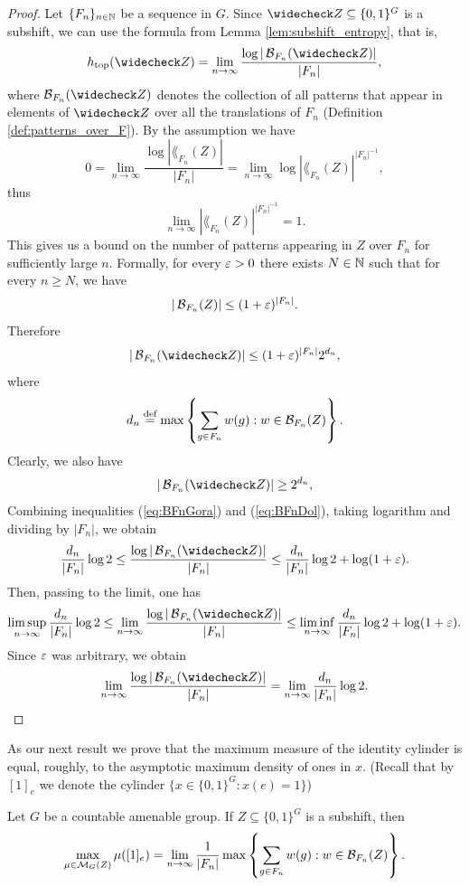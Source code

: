 \begin{proof}
Let $\{F_n\}_{n\in\mathbb{N}}$ be a \Folner sequence in $G$. Since $\subord{Z}\subseteq\{0,1\}^G$ is a subshift, we can use the formula from Lemma \ref{lem:subshift_entropy}, that is,
\[
\htop(\subord{Z})=\lim_{n\to\infty}\frac{\log|\lang_{F_n}(\subord{Z})|}{|F_n|},
\]
where $\lang_{F_n}(\subord{Z})$ denotes the collection of all patterns that appear in elements of $\subord{Z}$ over all the translations of $F_n$ (Definition \ref{def:patterns_over_F}).
By the assumption we have
\[
0=\lim_{n\to\infty}\frac{\log|\lang_{F_n}(Z)|}{|F_n|} =\lim_{n\to\infty}\log|\lang_{F_n}(Z)|^{|F_n|^{-1}},  
\]
thus
\[
\lim_{n\to\infty}|\lang_{F_n}(Z)|^{|F_n|^{-1}} =1.
\]
This gives us a bound on the number of patterns appearing in $Z$ over $F_n$ for sufficiently large $n$. Formally, 
for every $\varepsilon>0$ there exists $N\in\mathbb{N}$ such that for every $n\geq N$, we have
\[ 
|\operatorname{\mathcal{B}}_{F_n}(Z)|\leq(1+\varepsilon)^{|F_n|}.
\] 
Therefore 
\begin{equation}\label{eq:BFnGora}
|\lang_{F_n}(\subord Z)|\leq(1+\eps)^{|F_n|}2^{d_n},
\end{equation}
where 
\[
d_n\stackrel{\textup{def}}{=} \max\left\{\sum_{g\in F_n} w(g): w\in \mathcal B_{F_n}(Z)\right\}.
\]
Clearly, we also have 
\begin{equation}\label{eq:BFnDol}
|\lang_{F_n}(\subord Z)|\geq2^{d_n},
\end{equation}
Combining inequalities (\ref{eq:BFnGora}) and (\ref{eq:BFnDol}), taking logarithm and dividing by $|F_n|$, we obtain
\[
\frac{d_n}{|F_n|}\log 2 \leq \frac{\log|\lang_{F_n}(\subord Z)|}{|F_n|}\leq \frac{d_n}{|F_n|}\log 2 + \log(1+\eps).
\]
Then, passing to the limit, one has
\[
\limsup_{n\to\infty} \frac{d_n}{|F_n|}\log 2 \leq\lim_{n\to\infty} \frac{\log|\lang_{F_n}(\subord Z)|}{|F_n|}\leq \liminf_{n\to\infty}\frac{d_n}{|F_n|}\log 2 + \log(1+\eps).
\]
Since $\varepsilon$ was arbitrary, we obtain 
\[
\lim_{n\to\infty} \frac{\log|\lang_{F_n}(\subord Z)|}{|F_n|} = \lim_{n\to\infty}\frac{d_n}{|F_n|}\log 2 . \qedhere
\]
\end{proof}

\noindent As our next result we prove that the maximum measure of the identity cylinder is equal, roughly, to the asymptotic maximum density of ones in $x$. (Recall that by $[1]_e$ we denote the cylinder $\{x \in \{0,1\}^G: x(e) = 1\}$)

\begin{lem}\label{lem:max_measure_dens_ones}
Let $G$ be a countable amenable group.
If $Z\subseteq\{0,1\}^G$ is a subshift, then
\[
\max_{\mu\in\mathcal{M}_G(Z)}\mu([1]_e) = 
\lim_{n\to\infty}\frac{1}{|F_n|}\max\left\{\sum_{g\in F_n} w(g): w\in \mathcal B_{F_n}(Z)\right\}.
\]
\end{lem}

